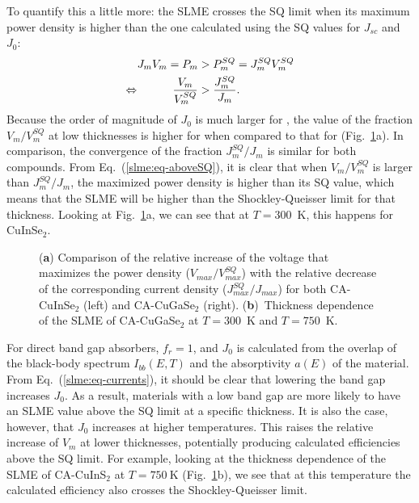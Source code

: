 \begin{refsection}
To quantify this a little more: the SLME crosses the SQ limit when its maximum power density is higher than 
the one calculated using the SQ values for $J_{sc}$ and $J_0$: 
\begin{equation} \label{slme:eq-aboveSQ} 
\begin{aligned} 
J_m V_m = P_m &> P_m^{SQ} = J_m^{SQ} V_m^{SQ} \\ 
\Leftrightarrow \hspace{0.4in}\frac{V_m}{V_m^{SQ}} &> \frac{J_m^{SQ}}{J_m}. 
\end{aligned} 
\end{equation} 
Because the order of magnitude of $J_0$ is much larger for 
, the value of the fraction $V_m/V_m^{SQ}$ at low 
thicknesses is higher for  when compared to that for 
 (Fig.~\ref{slme:fig-ratios_highT}a). In comparison, the 
convergence of the fraction $J_m^{SQ}/J_m$ is similar for both compounds. From 
Eq.~(\ref{slme:eq-aboveSQ}), it is clear that when $V_m/V_m^{SQ}$ is larger 
than $J_m^{SQ}/J_m$, the maximized power density is higher than its SQ value, 
which means that the SLME will be higher than the Shockley-Queisser limit for 
that thickness. Looking at Fig.~\ref{slme:fig-ratios_highT}a, we can see that at 
$T=300$~\si{\kelvin}, this happens for CuInSe$_2$. 

\begin{figure}[ht] 
\captionsetup{width=0.9\textwidth}
\centering 

\caption{(\textbf{\textsf{a}}) Comparison of the relative increase of the voltage that maximizes the power density ($V_{max}/V_{max}^{SQ}$) with the relative decrease of the corresponding current density ($J_{max}^{SQ}/J_{max}$) for both CA-CuInSe$_2$ (left) and CA-CuGaSe$_2$ (right). (\textbf{\textsf{b}})~Thickness dependence of the SLME of CA-CuGaSe$_2$ at $T = 300$~\si{\kelvin} and $T = 750$~\si{\kelvin}.} 
\label{slme:fig-ratios_highT} 
\end{figure}

For direct band gap absorbers, $f_r = 1$, and $J_0$ is calculated from the 
overlap of the black-body spectrum $I_{bb}(E,T)$ and the absorptivity $a(E)$ 
of the material. From Eq.~(\ref{slme:eq-currents}), it should be clear that 
lowering the band gap increases $J_0$. As a result, materials with a low band 
gap are more likely to have an SLME value above the SQ limit at a specific 
thickness. It is also the case, however, that $J_0$ increases at higher 
temperatures. This raises the relative increase of $V_m$ at lower 
thicknesses, potentially producing calculated efficiencies above the SQ limit. 
For example, looking at the thickness dependence of the SLME of CA-CuInS$_2$ 
at $T=750~\si{\kelvin}$ (Fig.~\ref{slme:fig-ratios_highT}b), we see that at this 
temperature the calculated efficiency also crosses the Shockley-Queisser 
limit.
 

\end{refsection}
